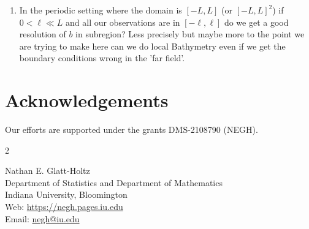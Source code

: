 \documentclass[18pt]{article}
\numberwithin{equation}{subsection}
\begin{document}
\begin{enumerate}[label=(\alph*)]
\item In the periodic setting where the domain is $[-L,L]$ (or $[-L,L]^2$) if $0< \ell \ll L$ and all our observations 
are in $[-\ell, \ell]$ do we get a good resolution of $b$ in subregion?  Less precisely but maybe more to the point
we are trying to make here can we do local Bathymetry even if we get the boundary conditions wrong in the 'far field'.
\end{enumerate}

\newpage
\section*{Acknowledgements}

Our efforts are supported under the grants  DMS-2108790
(NEGH). 





\newpage









\begin{multicols}{2}



  
\noindent
Nathan E. Glatt-Holtz\\ {\footnotesize
Department of Statistics and Department of Mathematics\\
Indiana University, Bloomington\\
Web: \url{https://negh.pages.iu.edu}\\
Email: \url{negh@iu.edu}} \\[.2cm]
\columnbreak


\end{multicols}
\end{document}
